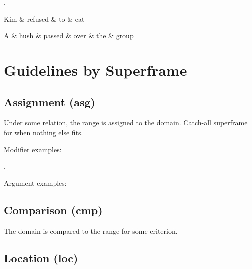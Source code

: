 \documentclass[a4paper]{article}
\begin{document}
\ex.
\begin{dependency}
    \begin{deptext}
        Kim \& refused \& to \& eat \\
    \end{deptext}
\end{dependency}
\begin{dependency}
    \begin{deptext}
        A \& hush \& passed \& over \& the \& group \\
    \end{deptext}
\end{dependency}

\section{Guidelines by Superframe}


\subsection{Assignment (asg)}

Under some relation, the range is assigned to the domain. Catch-all superframe for when nothing else fits.

Modifier examples:

\ex. 

Argument examples:

\subsection{Comparison (cmp)}

The domain is compared to the range for some criterion.

\subsection{Location (loc)}
\end{document}
